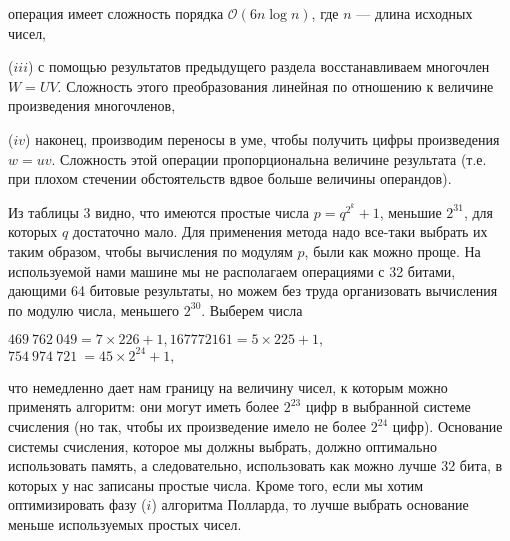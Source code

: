 \hspace{-14pt}операция имеет сложность порядка $\mathcal{O}(6n\log{}n)$, где $n$ --- длина исходных чисел, \par
  ($iii$) с помощью результатов предыдущего раздела 
восстанавливаем многочлен $W = UV$. Сложность этого преобразования линейная по отношению к величине произведения многочленов, \par
 ($iv$) наконец, производим переносы в уме, чтобы получить цифры
произведения $w = uv$. Сложность этой операции пропорциональна 
величине результата (т.е. при плохом стечении обстоятельств вдвое больше
величины операндов).\par
 Из таблицы 3 видно, что имеются простые числа $p = q^{2^{k}} + 1$, 
меньшие $2^{31}$, для которых $q$ достаточно мало. Для применения метода надо
все-таки выбрать их таким образом, чтобы вычисления по модулям $p$,
были как можно проще. На используемой нами машине мы не располагаем операциями с 32 битами, дающими 64 битовые результаты, но можем без труда организовать вычисления по модулю числа, меньшего $2^{30}$. Выберем числа
\begin{center}
$469\ 762\ 049 = 7 \times 226 + 1, 167 772 161 = 5 \times 225 + 1,$ \\
$754\ 974\ 721\ = 45 \times 2^{24} + 1,$
\end{center}
что немедленно дает нам границу на величину чисел, к которым 
можно применять алгоритм: они могут иметь более $2^{23}$ цифр в выбранной
системе счисления (но так, чтобы их произведение имело не более $2^{24}$
цифр). Основание системы счисления, которое мы должны выбрать, должно оптимально использовать память, а следовательно, использовать как можно лучше 32 бита, в которых у нас записаны простые числа. Кроме того, если мы хотим оптимизировать фазу ($i$) алгоритма Полларда, то лучше выбрать основание меньше используемых простых чисел. 
